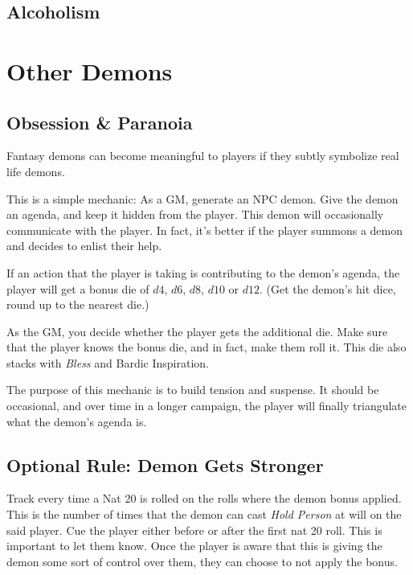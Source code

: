 \documentclass[twocolumn]{dndbook}
\begin{document}
\subsection{Alcoholism}

\section{Other Demons}
\subsection{Obsession \& Paranoia}


\begin{emphasisParagraph}
	Fantasy demons can become meaningful to players if they subtly symbolize real life demons.
\end{emphasisParagraph}

This is a simple mechanic: As a GM, generate an NPC demon.
Give the demon an agenda, and keep it hidden from the player.
This demon will occasionally communicate with the player.
In fact, it's better if the player summons a demon and decides to enlist their help.\par

If an action that the player is taking is contributing to the demon's agenda, the player will get a bonus die of $d4$, $d6$, $d8$, $d10$ or $d12$.
(Get the demon's hit dice, round up to the nearest die.)\par
As the GM, you decide whether the player gets the additional die. Make sure that the player knows the bonus die, and in fact, make them roll it.
This die also stacks with \emph{Bless} and Bardic Inspiration.\par

The purpose of this mechanic is to build tension and suspense. It should be occasional, and over time in a longer campaign, the player will finally triangulate what the demon's agenda is.\par

\subsection{Optional Rule: Demon Gets Stronger}
Track every time a Nat 20 is rolled on the rolls where the demon bonus applied.
This is the number of times that the demon can cast \emph{Hold Person} at will on the said player.
Cue the player either before or after the first nat 20 roll.
This is important to let them know.
Once the player is aware that this is giving the demon some sort of control over them, they can choose to not apply the bonus.
\end{document}
